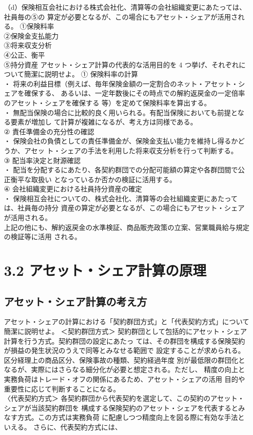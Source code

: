 \documentclass[report,gutter=10mm,fore-edge=10mm,uplatex,dvipdfmx]{jlreq}
\begin{document}
（d）保険相互会社における株式会社化、清算等の会社組織変更にあたっては、社員毎の⑤の
算定が必要となるが、この場合にもアセット・シェアが活用される。
\answer{}
\noindent ①保険料率\\②保険金支払能力\\
③将来収支分析\\④公正、衡平\\⑤持分資産
アセット・シェア計算の代表的な活用目的を 4 つ挙げ、それぞれについて簡潔に説明せよ。
\answer{}
\noindent
① 保険料率の計算\\
・ 将来の利益目標（例えば、毎年保険金額の一定割合のネット・アセット・シェアを確保する、
あるいは、一定年数後にその時点での解約返戻金の一定倍率のアセット・シェアを確保する
等）を定めて保険料率を算出する。\\
・ 無配当保険の場合に比較的良く用いられる。有配当保険においても前提となる要素が増加し
て計算が複雑になるが、考え方は同様である。\\
② 責任準備金の充分性の確認\\
・ 保険会社の負債としての責任準備金が、保険金支払い能力を維持し得るかどうか、アセッ
ト・シェアの手法を利用した将来収支分析を行って判断する。\\
③ 配当率決定と財源確認\\
・ 配当を分配するにあたり、各契約群団での分配可能額の算定や各群団間で公正衡平な取扱い
となっているか否かの検証に活用する。\\
④ 会社組織変更における社員持分資産の確定\\
・ 保険相互会社についての、株式会社化、清算等の会社組織変更にあたっては、社員毎の持分
資産の算定が必要となるが、この場合にもアセット・シェアが活用される。\\
上記の他にも、解約返戻金の水準検証、商品販売政策の立案、営業職員給与規定の検証等に活用
される。

\section{3.2 アセット・シェア計算の原理}
\subsection{アセット・シェア計算の考え方}
アセット・シェアの計算における「契約群団方式」と「代表契約方式」について簡潔に説明せよ。
\answer{}
\noindent
＜契約群団方式＞
契約群団として包括的にアセット・シェア計算を行う方式。契約群団の設定にあたっ
ては、その群団を構成する保険契約が損益の発生状況のうえで同等とみなせる範囲で
設定することが求められる。区分経理上の商品区分、保険事故の種類、契約経過年度
別が最低限の群団化となるが、実際にはさらなる細分化が必要と想定される。ただし、
精度の向上と実務負荷はトレード・オフの関係にあるため、アセット・シェアの活用
目的や重要性に応じて判断することになる。\\
〈代表契約方式＞
各契約群団から代表契約を選定して、この契約のアセット・シェアが当該契約群団を
構成する保険契約のアセット・シェアを代表するとみなす方式。この方式は実務負荷
に配慮しつつ精度向上を図る際に有効な手法といえる。
さらに、代表契約方式には、
\end{document}
